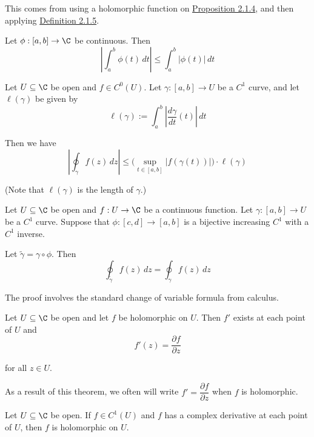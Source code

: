 This comes from using a holomorphic function on \href{f37b676}{Proposition
2.1.4}, and then applying \href{b1e96fc}{Definition 2.1.5}.

\label{bcec8b1}

Let $\phi:[a,b]\to\C$ be continuous. Then
$$
  \left|\int_a^b\phi(t)\,dt\right|\leq\int_a^b|\phi(t)|\,dt
$$

\label{faf3f86}

Let $U\subseteq\C$ be open and $f\in C^0(U)$. Let $\gamma:[a,b]\to U$ be a
$C^1$ curve, and let $\ell(\gamma)$ be given by
$$
  \ell(\gamma):=\int_a^b\left|\frac{d\gamma}{dt}(t)\right|\,dt
$$

Then we have
$$
  \left|\oint_\gamma f(z)\,dz\right|\leq
  \Big(\sup_{t\in[a,b]}|f(\gamma(t))|\Big)\cdot\ell(\gamma)
$$

(Note that $\ell(\gamma)$ is the length of $\gamma$.)

\label{f74efcb}

Let $U\subseteq\C$ be open and $f:U\to\C$ be a continuous function. Let
$\gamma:[a,b]\to U$ be a $C^1$ curve. Suppose that $\phi:[c,d]\to[a,b]$ is a
bijective increasing $C^1$ with a $C^1$ inverse.


Let $\tilde\gamma=\gamma\circ\phi$. Then
$$\oint_{\tilde\gamma}f(z)\,dz=\oint_\gamma f(z)\,dz$$

The proof involves the standard change of variable formula from calculus.

\label{f75e43c}

Let $U\subseteq\C$ be open and let $f$ be holomorphic on $U$. Then $f'$ exists
at each point of $U$ and
$$f'(z)=\frac{\partial f}{\partial z}$$

for all $z\in U$.

As a result of this theorem, we often will write $f'=\dfrac{\partial
  f}{\partial z}$ when $f$ is holomorphic.

\label{d037b0f}

Let $U\subseteq\C$ be open. If $f\in C^1(U)$ and $f$ has a complex derivative
at each point of $U$, then $f$ is holomorphic on $U$.

